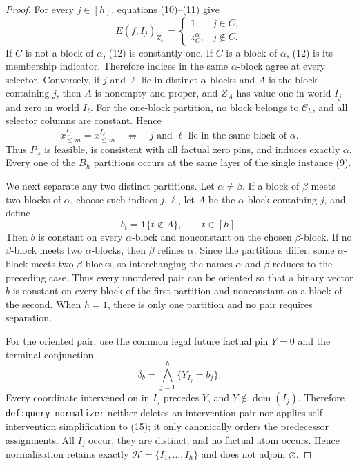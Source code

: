 \documentclass{article}
\begin{document}
\begin{proof}
For every \(j\in[h]\), equations (10)--(11) give
\[
 E(f,I_j)_{Z_C}=
 \begin{cases}
 1,&j\in C,\\
 z_C^\alpha,&j\notin C.
 \end{cases}
\tag{12}
\]
If \(C\) is not a block of \(\alpha\), (12) is constantly one.  If \(C\) is a block of \(\alpha\), (12) is its membership indicator.  Therefore indices in the same \(\alpha\)-block agree at every selector.  Conversely, if \(j\) and \(\ell\) lie in distinct \(\alpha\)-blocks and \(A\) is the block containing \(j\), then \(A\) is nonempty and proper, and \(Z_A\) has value one in world \(I_j\) and zero in world \(I_\ell\).  For the one-block partition, no block belongs to \(\mathscr C_h\), and all selector columns are constant.  Hence
\[
 x^{I_j}_{\leq m}=x^{I_\ell}_{\leq m}
 \quad\Longleftrightarrow\quad
 j\text{ and }\ell\text{ lie in the same block of }\alpha.
\tag{13}
\]
Thus \(P_\alpha\) is feasible, is consistent with all factual zero pins, and induces exactly \(\alpha\).  Every one of the \(B_h\) partitions occurs at the same layer of the single instance (9).

We next separate any two distinct partitions.  Let \(\alpha\neq\beta\).  If a block of \(\beta\) meets two blocks of \(\alpha\), choose such indices \(j,\ell\), let \(A\) be the \(\alpha\)-block containing \(j\), and define
\[
 b_t=\mathbf1\{t\notin A\},\qquad t\in[h].
\tag{14}
\]
Then \(b\) is constant on every \(\alpha\)-block and nonconstant on the chosen \(\beta\)-block.  If no \(\beta\)-block meets two \(\alpha\)-blocks, then \(\beta\) refines \(\alpha\).  Since the partitions differ, some \(\alpha\)-block meets two \(\beta\)-blocks, so interchanging the names \(\alpha\) and \(\beta\) reduces to the preceding case.  Thus every unordered pair can be oriented so that a binary vector \(b\) is constant on every block of the first partition and nonconstant on a block of the second.  When \(h=1\), there is only one partition and no pair requires separation.

For the oriented pair, use the common legal future factual pin \(Y=0\) and the terminal conjunction
\[
 \delta_b=\bigwedge_{j=1}^h\{Y_{I_j}=b_j\}.
\tag{15}
\]
Every coordinate intervened on in \(I_j\) precedes \(Y\), and \(Y\notin\operatorname{dom}(I_j)\).  Therefore \texttt{def:query-normalizer} neither deletes an intervention pair nor applies self-intervention simplification to (15); it only canonically orders the predecessor assignments.  All \(I_j\) occur, they are distinct, and no factual atom occurs.  Hence normalization retains exactly \(\mathcal H=\{I_1,\ldots,I_h\}\) and does not adjoin \(\varnothing\).


\end{proof}
\end{document}
